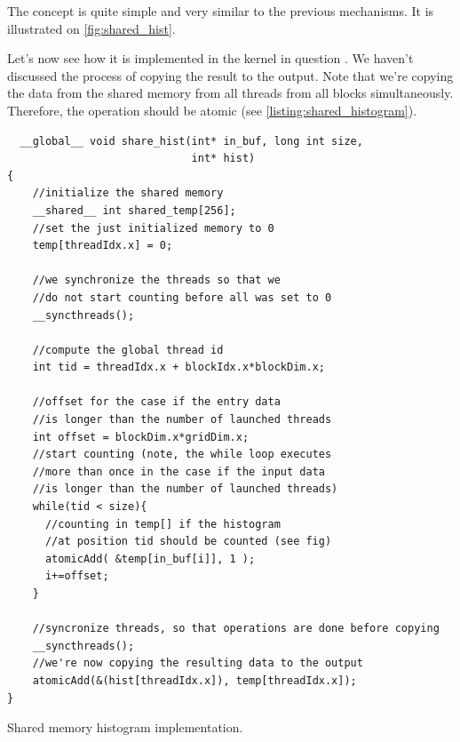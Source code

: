 The concept is quite simple and very similar to the previous mechanisms. It is illustrated on \autoref{fig:shared_hist}.

Let's now see how it is implemented in the kernel in question \cite{tehnologija_cuda}. 
We haven't discussed the process of copying the result to the output.
Note that we're copying the data from the shared memory 
from all threads from all blocks simultaneously. 
Therefore, the operation should be atomic (see \autoref{listing:shared_histogram}).

\begin{listing}[ht!]
\begin{verbatim}
  __global__ void share_hist(int* in_buf, long int size,
                             int* hist)
{
    //initialize the shared memory
    __shared__ int shared_temp[256];
    //set the just initialized memory to 0
    temp[threadIdx.x] = 0;

    //we synchronize the threads so that we 
    //do not start counting before all was set to 0
    __syncthreads();

    //compute the global thread id
    int tid = threadIdx.x + blockIdx.x*blockDim.x;

    //offset for the case if the entry data 
    //is longer than the number of launched threads
    int offset = blockDim.x*gridDim.x;
    //start counting (note, the while loop executes 
    //more than once in the case if the input data 
    //is longer than the number of launched threads)
    while(tid < size){
      //counting in temp[] if the histogram
      //at position tid should be counted (see fig)
      atomicAdd( &temp[in_buf[i]], 1 );
      i+=offset;
    }

    //syncronize threads, so that operations are done before copying
    __syncthreads();
    //we're now copying the resulting data to the output
    atomicAdd(&(hist[threadIdx.x]), temp[threadIdx.x]);
}
\end{verbatim}
\caption{Shared memory histogram implementation.}
\label{listing:shared_histogram}
\end{listing}





























